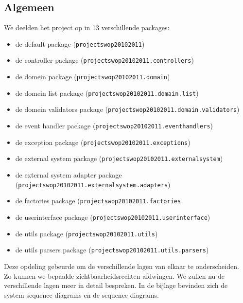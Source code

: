 \label{overzicht}
\subsection{Algemeen}
We deelden het project op in 13 verschillende packages:
\begin{itemize}
	\item de default package (\texttt{projectswop20102011})
  \item de controller package (\texttt{projectswop20102011.controllers})
  \item de domein package (\texttt{projectswop20102011.domain})
  \item de domein list package (\texttt{projectswop20102011.domain.list})
  \item de domein validators package (\texttt{projectswop20102011.domain.validators})
  \item de event handler package (\texttt{projectswop20102011.eventhandlers})
  \item de exception package (\texttt{projectswop20102011.exceptions})
  \item de external system package (\texttt{projectswop20102011.externalsystem})
  \item de external system adapter package (\texttt{projectswop20102011.externalsystem.adapters})
  \item de factories package (\texttt{projectswop20102011.factories}
  \item de userinterface package (\texttt{projectswop20102011.userinterface})
  \item de utils package (\texttt{projectswop20102011.utils})
  \item de utils parsers package (\texttt{projectswop20102011.utils.parsers})
\end{itemize}
Deze opdeling gebeurde om de verschillende lagen van elkaar te onderscheiden. Zo kunnen we bepaalde zichtbaarheidsrechten afdwingen. We zullen nu de verschillende lagen meer in detail bespreken. In de bijlage bevinden zich de system sequence diagrams en de sequence diagrams.

